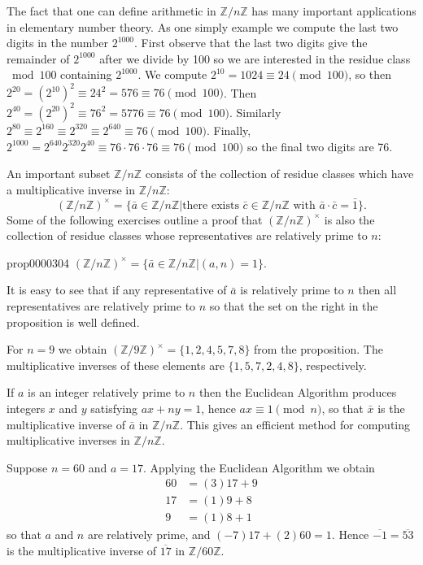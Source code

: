 \documentclass[cn,11pt,chinese]{elegantbook}
\numberwithin{equation}{section}
\begin{document}
The fact that one can define arithmetic in $\mathbb{Z}/n\mathbb{Z}$ has many important applications in elementary number theory. As one simply example we compute the last two digits in the  number $2^{1000}$. First observe that the last two digits give the remainder of $2^{1000}$ after we divide by 100 so we are interested in the residue class $\bmod{100}$ containing $2^{1000}$. We compute $2^{10} = 1024 \equiv 24 \pmod{100}$, so then $2^{20} = (2^{10})^2 \equiv 24^2 = 576 \equiv 76 \pmod{100}$. Then $2^{40} = (2^{20})^2  \equiv 76^2 = 5776 \equiv 76 \pmod{100}$. Similarly $2^{80} \equiv 2^{160} \equiv 2^{320} \equiv 2^{640} \equiv 76 \pmod{100}$. Finally, $2^{1000} = 2^{640}2^{320}2^{40} \equiv 76 \cdot 76 \cdot 76 \equiv 76 \pmod{100}$ so the final two digits are 76.

An important subset $\mathbb{Z}/n\mathbb{Z}$ consists of the collection of residue classes which have a multiplicative inverse in $\mathbb{Z}/n\mathbb{Z}$:
\[
(\mathbb{Z}/n\mathbb{Z})^{\times} = \{\bar{a} \in \mathbb{Z}/n\mathbb{Z} | \text{there exists }\bar{c} \in \mathbb{Z}/n\mathbb{Z} \text{ with } \bar{a} \cdot \bar{c} =\bar{1}\}.
\]
Some of the following exercises outline a proof that $(\mathbb{Z}/n\mathbb{Z})^{\times}$ is also the collection of residue classes whose representatives are relatively prime to $n$:
\begin{proposition}{}{prop0000304}
$(\mathbb{Z}/n\mathbb{Z})^{\times} = \{\bar{a} \in \mathbb{Z}/n\mathbb{Z} | (a, n) = 1\}$.
\end{proposition}

It is easy to see that if any representative of $\bar{a}$ is relatively prime to $n$ then all representatives are relatively prime to $n$ so that the set on the right in the proposition is well defined.

\begin{example}
For $n=9$ we obtain $(\mathbb{Z}/9\mathbb{Z})^{\times} = \{1,2,4,5,7,8\}$ from the proposition. The multiplicative inverses of these elements are $\{1, 5, 7, 2, 4, 8\}$, respectively.
\end{example}

If $a$ is an integer relatively prime to $n$ then the Euclidean Algorithm produces integers $x$ and $y$ satisfying $ax + ny = 1$, hence $ax \equiv 1 \pmod{n}$, so that $\bar{x}$ is the multiplicative inverse of $\bar{a}$ in $\mathbb{Z}/n\mathbb{Z}$. This gives an efficient method for computing multiplicative inverses in $\mathbb{Z}/n\mathbb{Z}$.

\begin{example}
Suppose $n = 60$ and $a = 17$. Applying the Euclidean Algorithm we obtain
\[
\begin{aligned}
60 &= (3)17 + 9\\
17 &= (1)9 + 8\\
9 &= (1)8 + 1
\end{aligned}
\]
so that $a$ and $n$ are relatively prime, and $(-7)17 + (2)60 = 1$. Hence $\overline{-1} = \overline{53}$ is the multiplicative inverse of $\overline{17}$ in $\mathbb{Z}/60\mathbb{Z}$.
\end{example}
\end{document}

